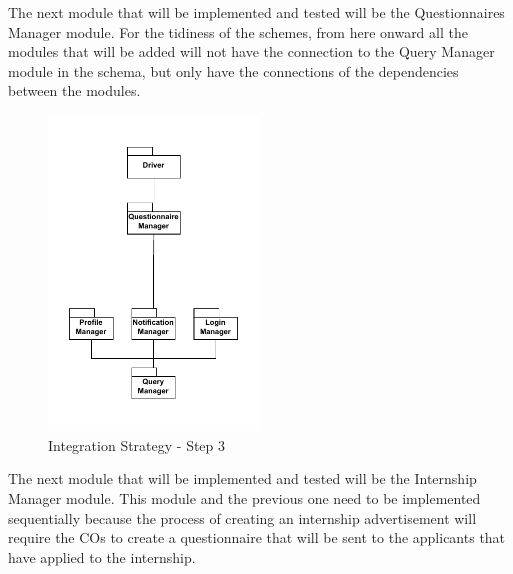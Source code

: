 \par The next module that will be implemented and tested will be the Questionnaires Manager module.
For the tidiness of the schemes, from here onward all the modules that will be added will not have the connection to the
Query Manager module in the schema, but only have the connections of the dependencies between the modules.

\begin{figure}[H]
    \centering
    \includegraphics[width=0.5\textwidth]{Images/Integ_3.pdf}
    \caption{Integration Strategy - Step 3}
    \label{fig:integration-strategy-step-3}
\end{figure}

\par The next module that will be implemented and tested will be the Internship Manager module. This module and the previous
one need to be implemented sequentially because the process of creating an internship advertisement will require the 
COs to create a questionnaire that will be sent to the applicants that have applied to the internship.

